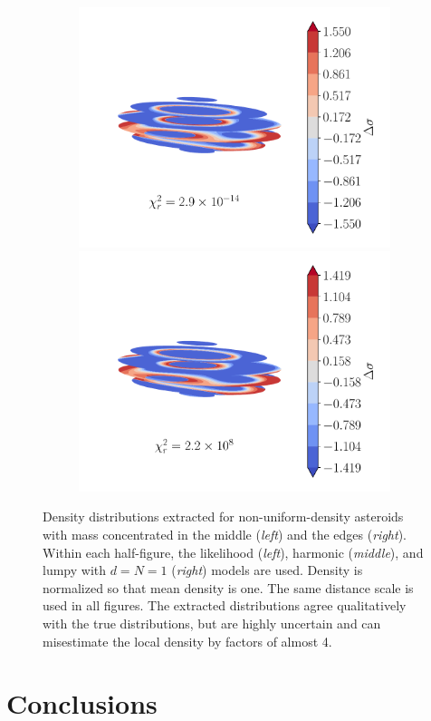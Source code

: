 \documentclass[fleqn,usenatbib]{mnras}
\begin{document}
{\begin{landscape}
\begin{figure}
\begin{subfigure}{0.49\linewidth}
        \includegraphics[width=0.33\linewidth]{figs/out-rat-likelihood.pdf}\hfill
        \includegraphics[width=0.33\linewidth]{figs/out-rat-harmonic.pdf}\hfill
        \hspace{0.33\linewidth}
      \end{subfigure}
    \caption{Density distributions extracted for non-uniform-density asteroids with mass concentrated in the middle (\textit{left}) and the edges (\textit{right}). Within each half-figure, the likelihood (\textit{left}), harmonic (\textit{middle}), and lumpy with $d=N=1$ (\textit{right}) models are used. Density is normalized so that mean density is one. The same distance scale is used in all figures. The extracted distributions agree qualitatively with the true distributions, but are highly uncertain and can misestimate the local density by factors of almost 4.}
    \label{fig:non-uniform-density}
  \end{figure}
  \end{landscape}
}

\section{Conclusions}
\end{document}
